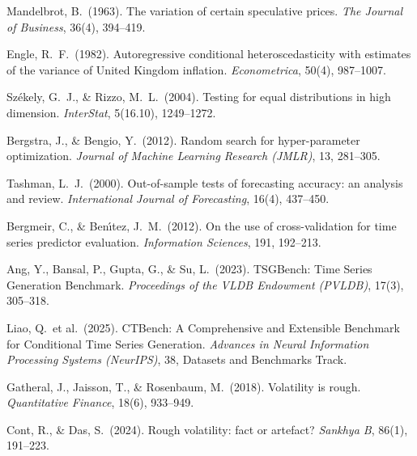 \documentclass[10pt]{article}
\begin{document}
{\begin{enumerate}[label={\textbf{[\arabic*]}},leftmargin=2.8em,itemsep=5pt,parsep=0pt,topsep=2pt]
\item \hypertarget{R:9}{}%
  Mandelbrot, B.\ (1963).
  The variation of certain speculative prices.
  \textit{The Journal of Business}, 36(4), 394--419.

\item \hypertarget{R:10}{}%
  Engle, R.\ F.\ (1982).
  Autoregressive conditional heteroscedasticity with estimates of the variance of
  United Kingdom inflation.
  \textit{Econometrica}, 50(4), 987--1007.

\item \hypertarget{R:11}{}%
  Sz\'{e}kely, G.\ J., \& Rizzo, M.\ L.\ (2004).
  Testing for equal distributions in high dimension.
  \textit{InterStat}, 5(16.10), 1249--1272.

\item \hypertarget{R:12}{}%
  Bergstra, J., \& Bengio, Y.\ (2012).
  Random search for hyper-parameter optimization.
  \textit{Journal of Machine Learning Research (JMLR)}, 13, 281--305.

\item \hypertarget{R:13}{}%
  Tashman, L.\ J.\ (2000).
  Out-of-sample tests of forecasting accuracy: an analysis and review.
  \textit{International Journal of Forecasting}, 16(4), 437--450.

\item \hypertarget{R:14}{}%
  Bergmeir, C., \& Ben\'{\i}tez, J.\ M.\ (2012).
  On the use of cross-validation for time series predictor evaluation.
  \textit{Information Sciences}, 191, 192--213.

\item \hypertarget{R:15}{}%
  Ang, Y., Bansal, P., Gupta, G., \& Su, L.\ (2023).
  TSGBench: Time Series Generation Benchmark.
  \textit{Proceedings of the VLDB Endowment (PVLDB)}, 17(3), 305--318.

\item \hypertarget{R:16}{}%
  Liao, Q.\ et al.\ (2025).
  CTBench: A Comprehensive and Extensible Benchmark for Conditional Time Series Generation.
  \textit{Advances in Neural Information Processing Systems (NeurIPS)}, 38,
  Datasets and Benchmarks Track.

\item \hypertarget{R:17}{}%
  Gatheral, J., Jaisson, T., \& Rosenbaum, M.\ (2018).
  Volatility is rough.
  \textit{Quantitative Finance}, 18(6), 933--949.

\item \hypertarget{R:18}{}%
  Cont, R., \& Das, S.\ (2024).
  Rough volatility: fact or artefact?
  \textit{Sankhya B}, 86(1), 191--223.


\end{enumerate}}
\end{document}
